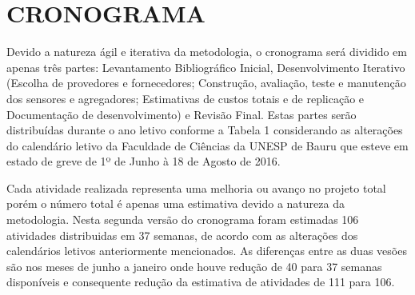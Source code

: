 
\chapter{CRONOGRAMA}
\label{chap:CRONOGRAMA}

Devido a natureza ágil e iterativa da metodologia, o cronograma será dividido em
apenas três partes: Levantamento Bibliográfico Inicial, Desenvolvimento
Iterativo (Escolha de provedores e fornecedores; Construção, avaliação, teste e
manutenção dos sensores e agregadores; Estimativas de custos totais e de
replicação e Documentação de desenvolvimento) e Revisão Final. Estas partes
serão distribuídas durante o ano letivo conforme a Tabela 1 considerando as
alterações do calendário letivo da Faculdade de Ciências da UNESP de Bauru que
esteve em estado de greve de 1º de Junho à 18 de Agosto de 2016.

\begin{table}[htb]
\end{table}

Cada atividade realizada representa uma melhoria ou avanço no projeto total
porém o número total é apenas uma estimativa devido a natureza da metodologia.
Nesta segunda versão do cronograma foram estimadas 106 atividades distribuidas
em 37 semanas, de acordo com as alterações dos calendários letivos anteriormente
mencionados. As diferenças entre as duas vesões são nos meses de junho a janeiro
onde houve redução de 40 para 37 semanas disponíveis e consequente redução da
estimativa de atividades de 111 para 106.
